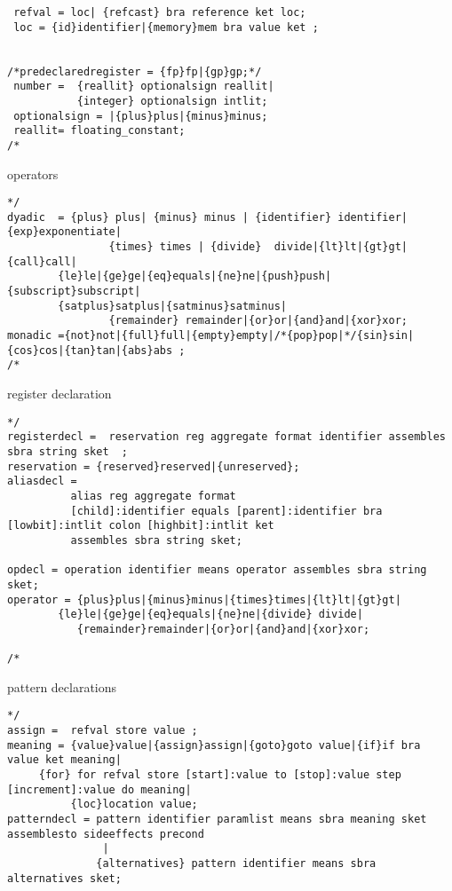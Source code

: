 \begin{verbatim}
 refval = loc| {refcast} bra reference ket loc;
 loc = {id}identifier|{memory}mem bra value ket ;
 

/*predeclaredregister = {fp}fp|{gp}gp;*/
 number =  {reallit} optionalsign reallit|
           {integer} optionalsign intlit;
 optionalsign = |{plus}plus|{minus}minus;
 reallit= floating_constant;
/*\end{verbatim} operators \begin{verbatim}*/ 
dyadic  = {plus} plus| {minus} minus | {identifier} identifier|{exp}exponentiate|
             	{times} times | {divide}  divide|{lt}lt|{gt}gt|{call}call|
		{le}le|{ge}ge|{eq}equals|{ne}ne|{push}push|{subscript}subscript|
		{satplus}satplus|{satminus}satminus|
             	{remainder} remainder|{or}or|{and}and|{xor}xor;
monadic ={not}not|{full}full|{empty}empty|/*{pop}pop|*/{sin}sin|{cos}cos|{tan}tan|{abs}abs ;
/*\end{verbatim} register declaration \begin{verbatim}*/
registerdecl =  reservation reg aggregate format identifier assembles sbra string sket  ;
reservation = {reserved}reserved|{unreserved};
aliasdecl =  
          alias reg aggregate format
          [child]:identifier equals [parent]:identifier bra [lowbit]:intlit colon [highbit]:intlit ket
          assembles sbra string sket;
	 
opdecl = operation identifier means operator assembles sbra string sket;
operator = {plus}plus|{minus}minus|{times}times|{lt}lt|{gt}gt|
		{le}le|{ge}ge|{eq}equals|{ne}ne|{divide} divide|
           {remainder}remainder|{or}or|{and}and|{xor}xor;

/*\end{verbatim} pattern declarations \begin{verbatim}*/
assign =  refval store value ;
meaning = {value}value|{assign}assign|{goto}goto value|{if}if bra value ket meaning|
	 {for} for refval store [start]:value to [stop]:value step [increment]:value do meaning| 
          {loc}location value;
patterndecl = pattern identifier paramlist means sbra meaning sket assemblesto sideeffects precond
               |
              {alternatives} pattern identifier means sbra alternatives sket;


\end{verbatim}
